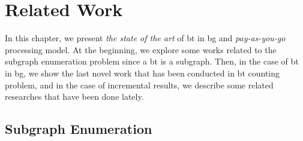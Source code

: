 \chapter{Related Work}\label{relate-work}
In this chapter, we present \emph{the state of the art} of \acrlong{bt} in \acrlong{bg} and \emph{pay-as-you-go} processing model.
At the beginning, we explore some works related to the subgraph enumeration problem since a \acrshort{bt} is a subgraph. Then, in the case of \acrshort{bt} in \acrshort{bg}, we show the last novel work that has been conducted in \acrshort{bt} counting problem,
and in the case of incremental results, we describe some related researches that have been done lately. 

\section{Subgraph Enumeration}\label{sec:rel-work:subgraph}
